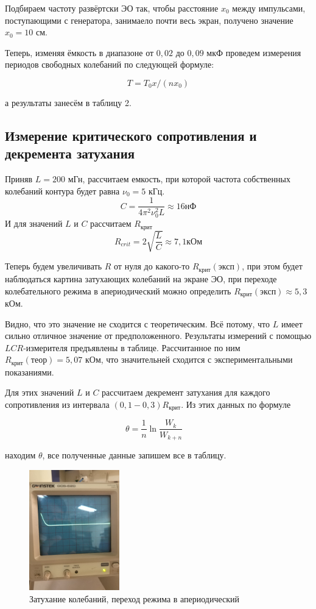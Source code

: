 \documentclass[a4paper, 12pt]{article}%
\begin{document}
Подбираем частоту развёртски ЭО так, чтобы расстояние $x_0$ между импульсами, поступающими с генератора, занимаело почти весь экран, получено значение $x_0 = 10$ см. 

Теперь, изменяя ёмкость в диапазоне от $0,02$ до $0,09$ мкФ проведем измерения периодов свободных колебаний по следующей формуле:

\[T = T_0x / (nx_0) \]

а результаты занесём в таблицу 2.


\subsection{Измерение критического сопротивления и декремента затухания}

Приняв $L = 200$ мГн, рассчитаем емкость, при которой частота собственных колебаний контура будет равна $\nu_0 = 5$ кГц.
\[C = \dfrac{1}{4 \pi^2 \nu_0^2 L} \approx 16 \text{нФ}\]
И для значений $L$ и $C$ рассчитаем $R_{\text{крит}}$
\[R_{crit} = 2\sqrt{\dfrac{L}{C}} \approx 7,1 \text{кОм}\]

Теперь будем увеличивать $R$ от нуля до какого-то $R_{\text{крит}} (\text{эксп})$, при этом будет наблюдаться картина затухающих колебаний на экране ЭО, при переходе колебательного режима в апериодический можно определить $R_{\text{крит}} (\text{эксп}) \approx 5,3 $ кОм.

Видно, что это значение не сходится с теоретическим. Всё потому, что $L$ имеет сильно отличное значение от предположенного. Результаты измерений с помощью $LCR$-измерителя предъявлены в таблице. Рассчитанное по ним $R_{\text{крит}} (\text{теор}) = 5,07$ кОм, что значительней сходится с экспериментальными показаниями.

Для этих значений $L$ и $C$ рассчитаем декремент затухания для каждого сопротивления из интервала $(0,1-0,3)R_{\text{крит}}$. Из этих данных по формуле
 
\[\theta = \frac{1}{n} \ln\frac{W_k}{W_{k+n}} \quad  \]

находим $\theta$, все полученные данные запишем все в таблицу. 


\begin{figure}[h]
\begin{center}
\includegraphics[width = 0.35\textwidth]{2.jpg}
\caption{Затухание колебаний, переход режима в апериодический}
\end{center}
\end{figure}
\end{document}

